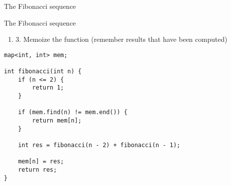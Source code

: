 \documentclass[10pt]{beamer}
\newcommand{\be}{\begin{enumerate}}
\newcommand{\ee}{\end{enumerate}}
\begin{document}
\begin{frame}[fragile]{The Fibonacci sequence}
\begin{figure}
% 
            \end{figure}

\end{frame}

\begin{frame}[fragile]{The Fibonacci sequence}
    \be
        \item[3.] Memoize the function (remember results that have been computed)
    \ee

    \vspace{5pt}

    \begin{verbatim}
map<int, int> mem;

int fibonacci(int n) {
    if (n <= 2) {
        return 1;
    }

    if (mem.find(n) != mem.end()) {
        return mem[n];
    }

    int res = fibonacci(n - 2) + fibonacci(n - 1);

    mem[n] = res;
    return res;
}
    \end{verbatim}

\end{frame}
\end{document}
